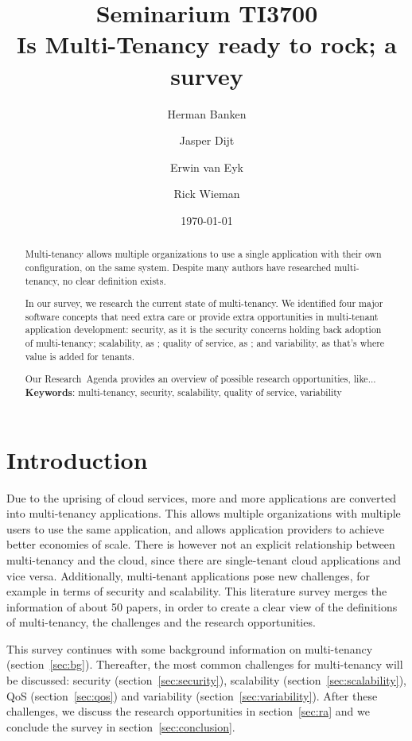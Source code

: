 \documentclass{article}
\title{Seminarium TI3700\\ Is Multi-Tenancy ready to rock; a survey}
\author{Herman Banken\and
    Jasper Dijt\and
    Erwin van Eyk\and
    Rick Wieman}
\date{\today}
\begin{document}
\maketitle
\thispagestyle{empty}

\begin{abstract}
Multi-tenancy allows multiple organizations to use a single application with their own configuration, on the same system. Despite many authors have researched multi-tenancy, no clear definition exists.

In our survey, we research the current state of multi-tenancy. We identified four major software concepts that need extra care or provide extra opportunities in multi-tenant application development: 
security, as it is the security concerns holding back adoption of multi-tenancy; %
scalability, as ; 			%
quality of service, as ; 	%
and variability, as that's where value is added for tenants.  

Our Research~Agenda provides an overview of possible research opportunities, 
like... %
\\

\textbf{Keywords}: multi-tenancy, security, scalability, quality of service, variability
\end{abstract}

\section{Introduction}
Due to the uprising of cloud services, more and more applications are converted into multi-tenancy applications. 
This allows multiple organizations with multiple users to use the same application, and allows application providers to achieve better economies of scale. 
There is however not an explicit relationship between multi-tenancy and the cloud, since there are single-tenant cloud applications and vice versa. 
Additionally, multi-tenant applications pose new challenges, for example in terms of security and scalability. 
This literature survey merges the information of about 50 papers, in order to create a clear view of the definitions of multi-tenancy, the challenges and the research opportunities.

This survey continues with some background information on multi-tenancy (section~\ref{sec:bg}). Thereafter, the most common challenges for multi-tenancy will be discussed: security (section~\ref{sec:security}), scalability (section~\ref{sec:scalability}), \ac{QoS} (section~\ref{sec:qos}) and variability (section~\ref{sec:variability}). After these challenges, we discuss the research opportunities in section~\ref{sec:ra} and we conclude the survey in section~\ref{sec:conclusion}. %
\end{document}
